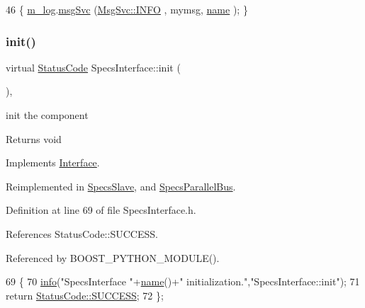 \begin{DoxyCode}
46 \{ \hyperlink{classObject_a0d269813dd7ac1f24bc143031e2963f2}{m\_log}.\hyperlink{classMsgSvc_ad25f18047920cc59a314e5098259711c}{msgSvc} (\hyperlink{classMsgSvc_ae671eb7301996cd049d2da8a65925926ad2fcf3f3e734fc41ee097cc23670ce51}{MsgSvc::INFO}    , mymsg, \hyperlink{classObject_a300f4c05dd468c7bb8b3c968868443c1}{name} ); \}
\end{DoxyCode}
\mbox{\label{classSpecsInterface_a99ec05cbe0d15892afbec6feaf33c89b}} 
\subsubsection{\texorpdfstring{init()}{init()}}
{\footnotesize\ttfamily virtual \hyperlink{classStatusCode}{Status\+Code} Specs\+Interface\+::init (\begin{DoxyParamCaption}{ }\end{DoxyParamCaption})\hspace{0.3cm}{\ttfamily [inline]}, {\ttfamily [virtual]}}

init the component

\begin{DoxyReturn}{Returns}
void 
\end{DoxyReturn}


Implements \hyperlink{classInterface_a1d095c113b1e89d1f5f68323856fee63}{Interface}.



Reimplemented in \hyperlink{classSpecsSlave_ab34b5117373a334027d3a5cf33287bb6}{Specs\+Slave}, and \hyperlink{classSpecsParallelBus_a43d9435450ba71990004638e42eec1ae}{Specs\+Parallel\+Bus}.



Definition at line 69 of file Specs\+Interface.\+h.



References Status\+Code\+::\+S\+U\+C\+C\+E\+SS.



Referenced by B\+O\+O\+S\+T\+\_\+\+P\+Y\+T\+H\+O\+N\+\_\+\+M\+O\+D\+U\+L\+E().


\begin{DoxyCode}
69                             \{
70     \hyperlink{classObject_a644fd329ea4cb85f54fa6846484b84a8}{info}(\textcolor{stringliteral}{"SpecsInterface "}+\hyperlink{classObject_a300f4c05dd468c7bb8b3c968868443c1}{name}()+\textcolor{stringliteral}{" initialization."},\textcolor{stringliteral}{"SpecsInterface::init"});
71     \textcolor{keywordflow}{return} \hyperlink{classStatusCode_a6f565cbeadc76d14c72f047e5e85eb4badd0da38d3ba0d922efd1f4619bc37ad8}{StatusCode::SUCCESS};
72   \};
\end{DoxyCode}
\mbox{\label{classAttrib_a704f26af560909ad22065083bb7d4c34}} 
